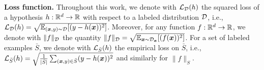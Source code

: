 \documentclass[11pt]{article} %
\numberwithin{equation}{section}
\begin{document}
\noindent\textbf{Loss function.} Throughout this work, we denote with ${\mathcal{L}}_{{\mathcal{D}}}(h)$ the squared loss of a hypothesis $h:\mathbb{R}^d\to \mathbb{R}$ with respect to a labeled distribution ${\mathcal{D}}$, i.e., ${\mathcal{L}}_{{\mathcal{D}}}(h) = \sqrt{\mathbb{E}_{({\bm{x}},y)\sim {\mathcal{D}}}[(y-h({\bm{x}}))^2]}$. Moreover, for any function $f:\mathbb{R}^d \to \mathbb{R}$, we denote with $\|f\|_{{\mathcal{D}}}$ the quantity $\|f\|_{{\mathcal{D}}} = \sqrt{\mathbb{E}_{{\bm{x}}\sim {\mathcal{D}}_{{\bm{x}}}}[(f({\bm{x}}))^2]}$. For a set of labeled examples $\bar{S}$, we denote with ${\mathcal{L}}_{\bar S}(h)$ the empirical loss on $\bar S$, i.e., ${\mathcal{L}}_{\bar S}(h) = \sqrt{\frac{1}{|\bar S|}\sum_{({\bm{x}},y)\in \bar S}(y-h({\bm{x}}))^2}$ and similarly for $\|f\|_{S}$.


\end{document}
